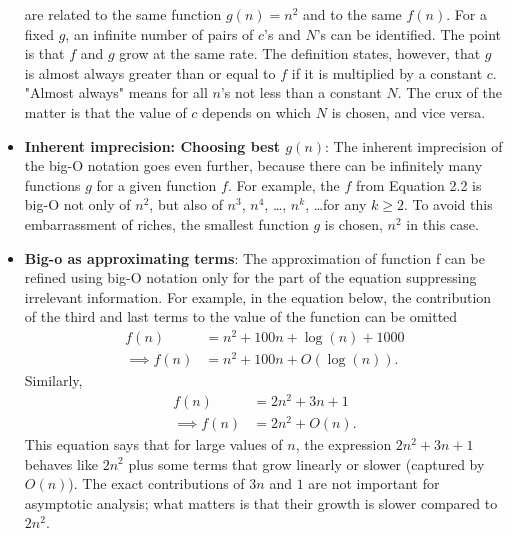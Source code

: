 \documentclass{report}
\begin{document}
\begin{itemize}
             are related to the same function \(g(n) = n^2\) and to the same \(f(n)\). For a fixed \(g\), an infinite
             number of pairs of \(c\)'s and \(N\)'s can be identified. The point is that \(f\) and \(g\) grow at the same
             rate. The definition states, however, that \(g\) is almost always greater than or equal to \(f\) if it
             is multiplied by a constant \(c\). "Almost always" means for all \(n\)'s not less than a constant \(N\).
             The crux of the matter is that the value of \(c\) depends on which \(N\) is chosen, and vice
             versa.
         \item \textbf{Inherent imprecision: Choosing best $g(n)$}: The inherent imprecision of the big-O notation goes even further, because there 
             can be infinitely many functions \(g\) for a given function \(f\). For example, the \(f\) from 
             Equation 2.2 is big-O not only of \(n^2\), but also of \(n^3\), \(n^4\), \dots, \(n^k\), \dots for any \(k \geq 2\). 
             To avoid this embarrassment of riches, the smallest function \(g\) is chosen, \(n^2\) in this case.
        \item \textbf{Big-o as approximating terms}:  The approximation of function f can be refined using big-O notation only for
            the part of the equation suppressing irrelevant information. For example, in the equation below, the contribution of the third and last terms to the value of the function can
            be omitted
            \bigbreak \noindent 
            \begin{align*}
                f(n) &=n^{2} + 100n + \log(n) + 1000 \\
                \implies  f(n) &= n^{2} + 100n + O(\log(n))
            .\end{align*}
            \bigbreak \noindent 
            Similarly, 
            \begin{align*}
                f(n) &= 2n^{2} + 3n + 1 \\
                \implies f(n) &= 2n^{2} + O(n)
            .\end{align*}
            \bigbreak \noindent 
            This equation says that for large values of \(n\), the expression \(2n^2 + 3n + 1\) behaves like \(2n^2\) plus some terms that grow linearly or slower (captured by \(O(n)\)). The exact contributions of \(3n\) and \(1\) are not important for asymptotic analysis; what matters is that their growth is slower compared to \(2n^2\).
        





\end{itemize}
\end{document}
